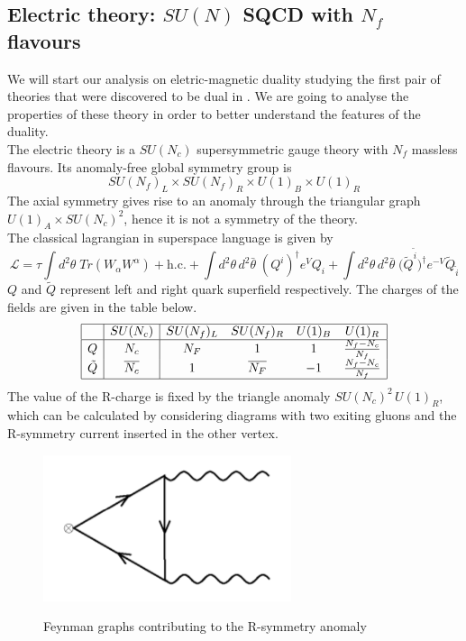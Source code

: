 \subsection{Electric theory: $SU(N)$ SQCD with $N_f$ flavours }
We will start our analysis on eletric-magnetic duality studying the first pair of theories that were discovered to be dual in \cite{Seiberg:1994pq}.  
We are going to analyse the properties of these theory in order to better understand the features of the duality.
\\
The electric theory is a $SU(N_c) $ supersymmetric gauge theory with $N_f$ massless flavours.
Its anomaly-free global symmetry group is 
\begin{equation}
SU(N_f)_L \times SU(N_f)_R \times U(1)_B \times U(1)_R 
\label{eqn:seib_dual_global_symm_group}
\end{equation}
The axial symmetry gives rise to an anomaly through the triangular graph $U(1)_A  \times SU(N_c)^2$, hence it is not a symmetry of the theory.\\ 
The classical lagrangian in superspace language is given by
\begin{equation}
 \mathcal{L} = \tau \int d^2 \theta \; Tr ( W_{\alpha} W^{\alpha} ) + \mathrm{h.c.} + 
 \int d^2 \theta \, d^2 \bar{\theta} \;  ({Q}^{i})^{\dagger} e^{ V} Q_i +
 \int d^2 \theta \, d^2 \bar{\theta} \; ({\tilde{Q}^{\tilde{i}})^{ \dagger}} e^{- V} \tilde{Q}_{\tilde{i}}
 \end{equation} 
$Q$ and $\tilde{Q}$ represent left and right quark superfield respectively.
The charges of the fields are given in the table below.
\begin{equation}
 \begin{array}{| c | c |  c c c c |}
 \hline
 & SU(N_c) & SU(N_f)_L  &SU(N_f)_R   & U(1)_B &  U(1)_R \\
\hline
Q & N_c & N_F & 1   &  1  &  \frac{N_f - N_c}{N_f}  \\
\tilde{Q} &\overline{N_c}  &  1 & \overline{ N_F}   & -1   &  \frac{N_f - N_c}{N_f}   \\	 
\hline
 \end{array} 
 \label{tab:suN_elect_charge}
\end{equation}
The value of the R-charge is fixed by the triangle anomaly $SU(N_c)^2 \, U(1)_R $, which can be calculated by considering diagrams with two exiting gluons and the R-symmetry current inserted in the other vertex.
\begin{figure}
\centering
\includegraphics[scale=0.6]{r-symm_anomlay.png}
\label{fig:r_symm_triangle_anom}
\caption{Feynman graphs contributing to the R-symmetry anomaly}
\end{figure}
